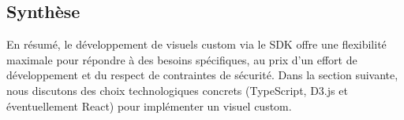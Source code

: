 \subsection*{Synthèse}
En résumé, le développement de visuels custom via le SDK offre une flexibilité maximale pour répondre à des besoins spécifiques, au prix d’un effort de développement et du respect de contraintes de sécurité. Dans la section suivante, nous discutons des choix technologiques concrets (TypeScript, D3.js et éventuellement React) pour implémenter un visuel custom.
